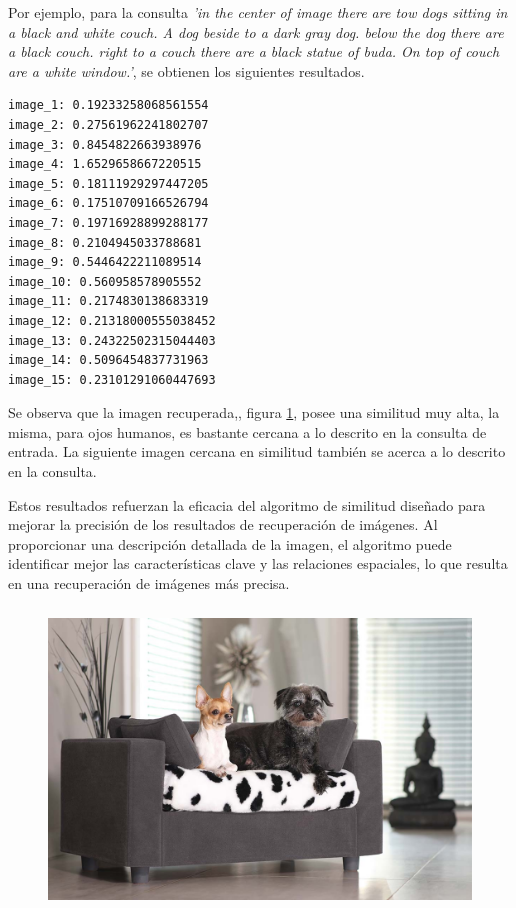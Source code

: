 Por ejemplo, para la consulta \textit{'in the center of image there are tow dogs sitting in a black and white couch. A dog beside to a dark gray dog.  below the dog there are a black couch. right to a couch there are a black statue of buda. On top of couch are a white window.'}, se obtienen los siguientes resultados.
\begin{verbatim}
image_1: 0.19233258068561554
image_2: 0.27561962241802707
image_3: 0.8454822663938976
image_4: 1.6529658667220515
image_5: 0.18111929297447205
image_6: 0.17510709166526794
image_7: 0.19716928899288177
image_8: 0.2104945033788681
image_9: 0.5446422211089514
image_10: 0.560958578905552
image_11: 0.2174830138683319
image_12: 0.21318000555038452
image_13: 0.24322502315044403
image_14: 0.5096454837731963
image_15: 0.23101291060447693
\end{verbatim}
Se observa que la imagen recuperada,, figura \ref{fig:dogs_couch}, posee una similitud muy alta, la misma, para ojos humanos, es bastante cercana a lo descrito en la consulta de entrada. La siguiente imagen cercana en similitud también se acerca a lo descrito en la consulta.

Estos resultados refuerzan la eficacia del algoritmo de similitud diseñado para mejorar la precisión de los resultados de recuperación de im\'agenes. Al proporcionar una descripción detallada de la imagen, el algoritmo puede identificar mejor las características clave y las relaciones espaciales, lo que resulta en una recuperación de im\'agenes m\'as precisa.

\begin{figure}[H]
\centering
 \includegraphics[height=80mm]{Graphics/Images/image_4.jpg}
 \caption{ }
 \label{fig:dogs_couch}
\end{figure}

